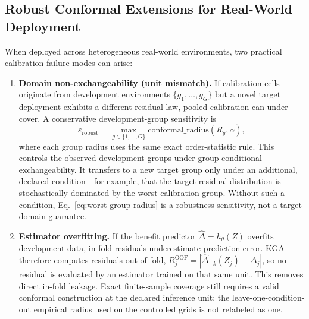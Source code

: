 \subsection{Robust Conformal Extensions for Real-World Deployment}
\label{sec:robust-conformal-extensions}

When deployed across heterogeneous real-world environments, two practical calibration failure modes can arise:
\begin{enumerate}
  \item \textbf{Domain non-exchangeability (unit mismatch).} If calibration cells originate from development environments $\{g_1, \dots, g_G\}$ but a novel target deployment exhibits a different residual law, pooled calibration can under-cover. A conservative development-group sensitivity is
  \begin{equation}
    \varepsilon_{\mathrm{robust}} = \max_{g \in \{1, \dots, G\}} \mathrm{conformal\_radius}(R_g, \alpha),
    \label{eq:worst-group-radius}
  \end{equation}
  where each group radius uses the same exact order-statistic rule. This controls the observed
  development groups under group-conditional exchangeability. It transfers to a new target group
  only under an additional, declared condition---for example, that the target residual distribution
  is stochastically dominated by the worst calibration group. Without such a condition,
  Eq.~\eqref{eq:worst-group-radius} is a robustness sensitivity, not a target-domain guarantee.
  \item \textbf{Estimator overfitting.} If the benefit predictor $\widehat\Delta = h_\theta(Z)$ overfits development data, in-fold residuals underestimate prediction error. KGA therefore computes residuals out of fold,
  $R_j^{\mathrm{OOF}} = |\widehat\Delta_{-k}(Z_j) - \Delta_j|$, so no residual is evaluated by an estimator trained on that same unit. This removes direct in-fold leakage. Exact finite-sample coverage still requires a valid conformal construction at the declared inference unit; the leave-one-condition-out empirical radius used on the controlled grids is not relabeled as one.
\end{enumerate}
